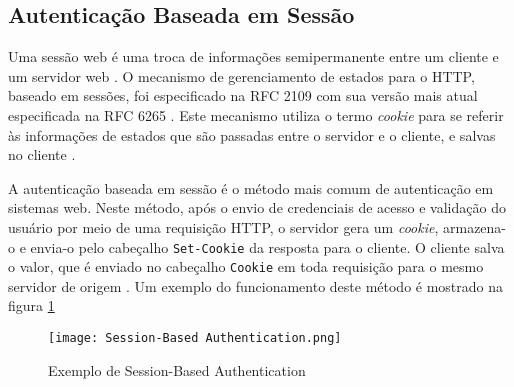 \subsection{Autenticação Baseada em Sessão}

Uma sessão web é uma troca de informações semipermanente entre um cliente e um servidor web \cite{CALZAVARA2017}. O mecanismo de gerenciamento de estados para o HTTP, baseado em sessões, foi especificado na RFC 2109 \cite{RFC2109} com sua versão mais atual especificada na RFC 6265 \cite{RFC6265}. Este mecanismo utiliza o termo \emph{cookie} para se referir às informações de estados que são passadas entre o servidor e o cliente, e salvas no cliente \cite{RFC2109}. 

A autenticação baseada em sessão é o método mais comum de autenticação em sistemas web. Neste método, após o envio de credenciais de acesso e validação do usuário por meio de uma requisição HTTP, o servidor gera um \emph{cookie}, armazena-o e envia-o pelo cabeçalho \texttt{Set-Cookie} da resposta para o cliente. O cliente salva o valor, que é enviado no cabeçalho \texttt{Cookie} em toda requisição para o mesmo servidor de origem \cite{PAPATHANASAKI2022}. Um exemplo do funcionamento deste método é mostrado na figura \ref{fig:sessionAuth}

\begin{figure}[ht]
  \centering
  \texttt{[image: Session-Based Authentication.png]}
  \caption{Exemplo de Session-Based Authentication}
  \label{fig:sessionAuth}
\end{figure}